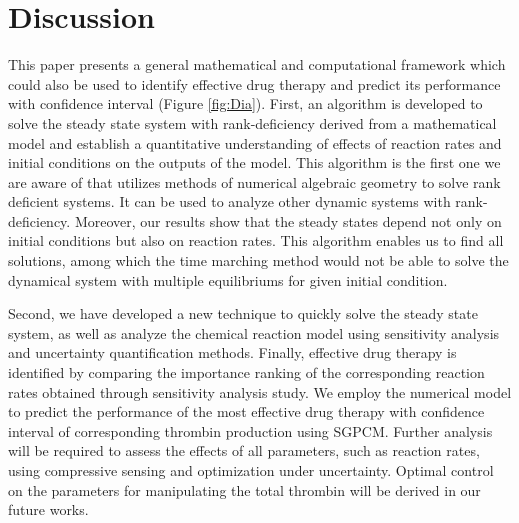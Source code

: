 \def\CTeXPreproc{Created by ctex v0.2.11, don't edit!}\section*{Discussion}
\label{sec:conc} This paper presents a general mathematical and
computational framework which could also be used to identify effective drug therapy and
predict its performance with confidence interval (Figure
\ref{fig:Dia}).  First, an algorithm is developed to solve the
steady state system with rank-deficiency derived from a mathematical
model and establish a quantitative understanding of effects of
 reaction rates and initial conditions on the outputs of the model. This algorithm  is the first one we are aware
of that utilizes methods of numerical algebraic geometry to solve
rank deficient systems. It can be used to analyze other dynamic
systems with rank-deficiency. Moreover, our results show that the
steady states depend not only on initial conditions but also on
reaction rates. This algorithm enables us to find all solutions,
among which the time marching method would not be able to solve the
dynamical system with multiple equilibriums for given initial
condition.

Second, we have developed a new technique to quickly solve
the steady state system, as well as analyze the chemical reaction
model using sensitivity analysis and uncertainty quantification methods. 
Finally, effective drug therapy
is identified by comparing the importance ranking of the
corresponding reaction rates obtained through sensitivity analysis
study. We employ the numerical model to predict the performance of
the most effective drug therapy with confidence interval of
corresponding thrombin production using SGPCM. Further analysis will
be required to assess the effects of all parameters, such as
reaction rates, using compressive sensing and optimization under
uncertainty. Optimal control on the parameters for manipulating the
total thrombin will be derived in our future works.


